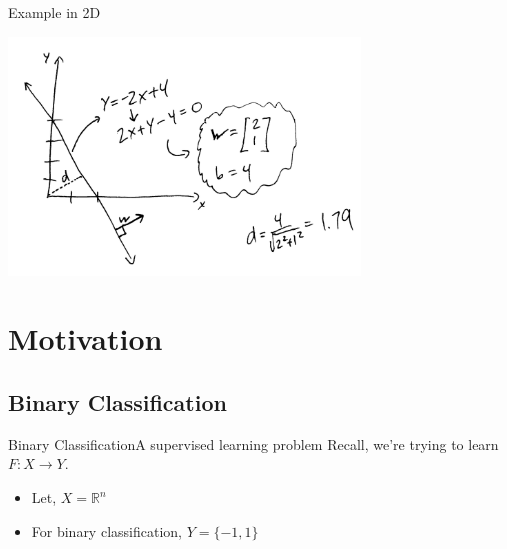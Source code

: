\documentclass[xcolor=dvipsnames]{beamer}
\begin{document}
\begin{frame}{Example in 2D}
    \begin{center}
        \includegraphics[width=0.7\textwidth]{figs/2d_hyper_example.png}
    \end{center}
\end{frame}

\section{Motivation}

\subsection{Binary Classification}

\begin{frame}{Binary Classification}{A supervised learning problem}
    Recall, we're trying to learn $F:X \rightarrow Y$.\\
    \vspace{0.5em}
    \begin{itemize}
        \item Let, $X = \mathbb{R}^n$
        \item For binary classification, $Y = \{-1, 1\}$\\
    \end{itemize}
    \vspace{2em}
\end{frame}
\end{document}
